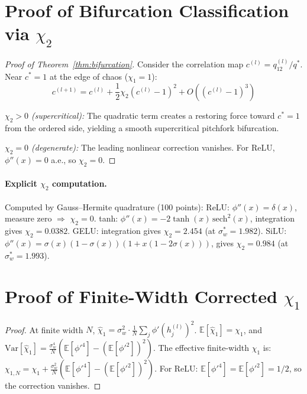 \documentclass[10pt]{article}
\newcommand{\EE}{\mathbb{E}}
\newcommand{\Var}{\mathrm{Var}}
\begin{document}
\section{Proof of Bifurcation Classification via $\chi_2$}
\label{app:chi2-proof}

\begin{proof}[Proof of Theorem~\ref{thm:bifurcation}]
Consider the correlation map $c^{(l)} = q_{12}^{(l)}/q^*$.
Near $c^* = 1$ at the edge of chaos ($\chi_1 = 1$):
\begin{equation}
    c^{(l+1)} = c^{(l)} + \frac{1}{2}\chi_2 (c^{(l)} - 1)^2 + O((c^{(l)} - 1)^3)
\end{equation}

\emph{$\chi_2 > 0$ (supercritical):}
The quadratic term creates a restoring force toward $c^* = 1$ from the ordered side, yielding a smooth supercritical pitchfork bifurcation.

\emph{$\chi_2 = 0$ (degenerate):}
The leading nonlinear correction vanishes.
For ReLU, $\phi''(x) = 0$ a.e., so $\chi_2 = 0$.
\end{proof}

\paragraph{Explicit $\chi_2$ computation.}
Computed by Gauss--Hermite quadrature (100 points):
ReLU: $\phi''(x) = \delta(x)$, measure zero $\Rightarrow$ $\chi_2 = 0$.
tanh: $\phi''(x) = -2\tanh(x)\,\text{sech}^2(x)$, integration gives $\chi_2 = 0.0382$.
GELU: integration gives $\chi_2 = 2.454$ (at $\sigma_w^* = 1.982$).
SiLU: $\phi''(x) = \sigma(x)(1-\sigma(x))(1 + x(1 - 2\sigma(x)))$, gives $\chi_2 = 0.984$ (at $\sigma_w^* = 1.993$).

\section{Proof of Finite-Width Corrected $\chi_1$}
\label{app:corrected-chi1-proof}

\begin{proof}
At finite width $N$, $\hat{\chi}_1 = \sigma_w^2 \cdot \frac{1}{N}\sum_j \phi'(h_j^{(l)})^2$.
$\EE[\hat{\chi}_1] = \chi_1$, and $\Var[\hat{\chi}_1] = \frac{\sigma_w^4}{N}(\EE[\phi'^4] - (\EE[\phi'^2])^2)$.
The effective finite-width $\chi_1$ is:
$\chi_{1,N} = \chi_1 + \frac{\sigma_w^2}{N}(\EE[\phi'^4] - (\EE[\phi'^2])^2)$.
For ReLU: $\EE[\phi'^4] = \EE[\phi'^2] = 1/2$, so the correction vanishes.
\end{proof}
\end{document}
